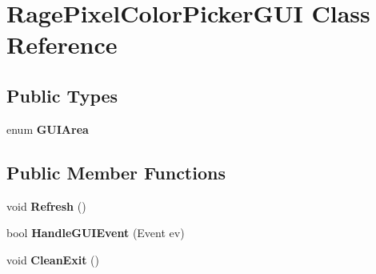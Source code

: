 \hypertarget{class_rage_pixel_color_picker_g_u_i}{\section{Rage\-Pixel\-Color\-Picker\-G\-U\-I Class Reference}
\label{class_rage_pixel_color_picker_g_u_i}
}
\subsection*{Public Types}
\begin{DoxyCompactItemize}
\item 
enum {\bfseries G\-U\-I\-Area} 
\end{DoxyCompactItemize}
\subsection*{Public Member Functions}
\begin{DoxyCompactItemize}
\item 
\hypertarget{class_rage_pixel_color_picker_g_u_i_ae9ca7e4283c2afae196bcc6dcf4e6f11}{void {\bfseries Refresh} ()}\label{class_rage_pixel_color_picker_g_u_i_ae9ca7e4283c2afae196bcc6dcf4e6f11}

\item 
\hypertarget{class_rage_pixel_color_picker_g_u_i_ac5828d1d7689c7d161691fc1407c349f}{bool {\bfseries Handle\-G\-U\-I\-Event} (Event ev)}\label{class_rage_pixel_color_picker_g_u_i_ac5828d1d7689c7d161691fc1407c349f}

\item 
\hypertarget{class_rage_pixel_color_picker_g_u_i_ae1f8b700dce656eafd815b036e47f499}{void {\bfseries Clean\-Exit} ()}\label{class_rage_pixel_color_picker_g_u_i_ae1f8b700dce656eafd815b036e47f499}

\end{DoxyCompactItemize}
